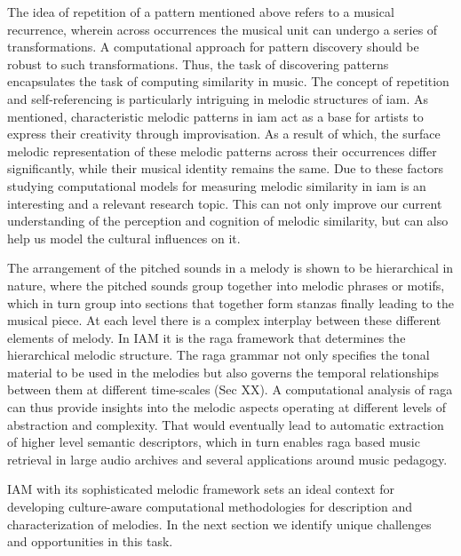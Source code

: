 The idea of repetition of a pattern mentioned above refers to a musical recurrence, wherein across occurrences the musical unit can undergo a series of transformations. A computational approach for pattern discovery should be robust to such transformations. Thus, the task of discovering patterns encapsulates the task of computing similarity in music.  The concept of repetition and self-referencing is particularly intriguing in melodic structures of \gls{iam}. As mentioned, characteristic melodic patterns in \gls{iam} act as a base for artists to express their creativity through improvisation. As a result of which, the surface melodic representation of these melodic patterns across their occurrences differ significantly, while their musical identity remains the same. Due to these factors studying computational models for measuring melodic similarity in \gls{iam} is an interesting and a relevant research topic. This can not only improve our current understanding of the perception and cognition of melodic similarity, but can also help us model the cultural influences on it. 

The arrangement of the pitched sounds in a melody is shown to be hierarchical in nature, where the pitched sounds group together into melodic phrases or motifs, which in turn group into sections that together form stanzas finally leading to the musical piece. At each level there is a complex interplay between these different elements of melody. In IAM it is the raga framework that determines the hierarchical melodic structure. The raga grammar not only specifies the tonal material to be used in the melodies but also governs the temporal relationships between them at different time-scales (Sec XX). A computational analysis of raga can thus provide insights into the melodic aspects operating at different levels of abstraction and complexity. That would eventually lead to automatic extraction of higher level semantic descriptors, which in turn enables raga based music retrieval in large audio archives and several applications around music pedagogy.


IAM with its sophisticated melodic framework sets an ideal context for developing culture-aware computational methodologies for description and characterization of melodies. In the next section we identify unique challenges and opportunities in this task. 


